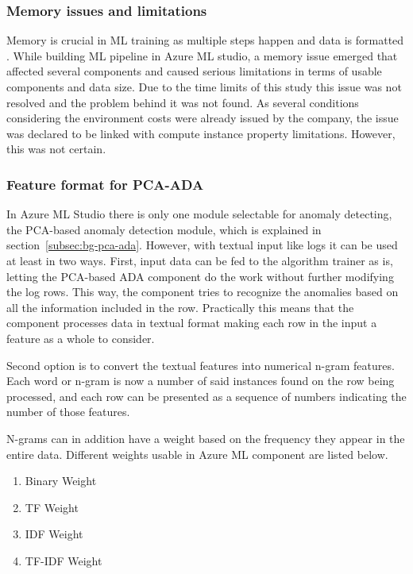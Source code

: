\subsubsection*{Memory issues and limitations}
Memory is crucial in ML training
as multiple steps happen
and data is formatted \etc. %
While building ML pipeline in Azure ML studio,
a memory issue emerged
that affected several components
and caused serious limitations
in terms of usable components and data size.
Due to the time limits of this study
this issue was not resolved
and the problem behind it was not found.
As several conditions
considering the environment costs
were already issued by the company,
the issue was declared to be linked with
compute instance property limitations.
However, this was not certain.



\subsubsection*{Feature format for PCA-ADA}
In Azure ML Studio
there is only one module selectable
for anomaly detecting,
the PCA-based anomaly detection module,
which is explained in section~\ref{subsec:bg-pca-ada}.
However,
with textual input like logs
it can be used at least in two ways.
First,
input data can be fed to
the algorithm trainer as is,
letting the PCA-based ADA component %
do the work without further modifying the log rows.
This way,
the component tries to recognize the anomalies
based on all the information included in the row.
Practically this means
that the component processes data in textual format
making each row in the input
a feature as a whole
to consider.

Second option is to
convert the textual features
into numerical n-gram features.
Each word or n-gram
is now a number of said instances found on
the row being processed,
and each row can be presented
as a sequence of numbers
indicating the number of those features.

N-grams can in addition have a weight
based on the frequency they appear
in the entire data.
Different weights usable in Azure ML component
are listed below.

\begin{enumerate}
    \item Binary Weight
    \item TF Weight
    \item IDF Weight
    \item TF-IDF Weight
\end{enumerate}

